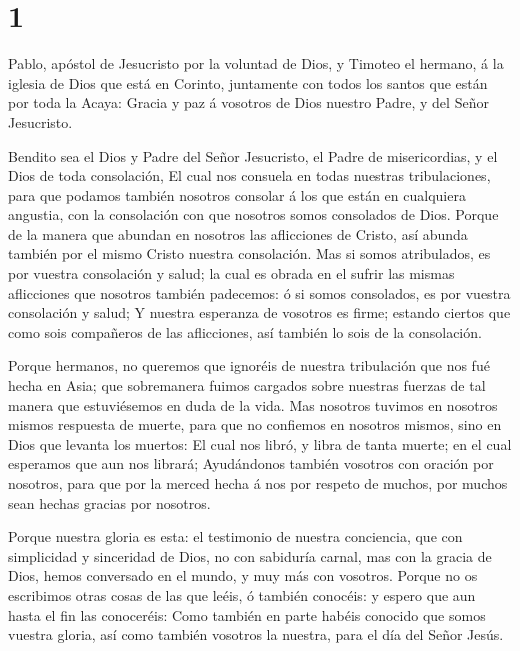 \hypertarget{section}{%
\section{1}\label{section}}

 Pablo, apóstol de Jesucristo por la voluntad de Dios, y
Timoteo el hermano, á la iglesia de Dios que está en Corinto, juntamente
con todos los santos que están por toda la Acaya:  Gracia y
paz á vosotros de Dios nuestro Padre, y del Señor Jesucristo.

 Bendito sea el Dios y Padre del Señor Jesucristo, el Padre
de misericordias, y el Dios de toda consolación,  El cual
nos consuela en todas nuestras tribulaciones, para que podamos también
nosotros consolar á los que están en cualquiera angustia, con la
consolación con que nosotros somos consolados de Dios. 
Porque de la manera que abundan en nosotros las aflicciones de Cristo,
así abunda también por el mismo Cristo nuestra consolación. 
Mas si somos atribulados, es por vuestra consolación y salud; la cual es
obrada en el sufrir las mismas aflicciones que nosotros también
padecemos: ó si somos consolados, es por vuestra consolación y salud;
 Y nuestra esperanza de vosotros es firme; estando ciertos
que como sois compañeros de las aflicciones, así también lo sois de la
consolación.

 Porque hermanos, no queremos que ignoréis de nuestra
tribulación que nos fué hecha en Asia; que sobremanera fuimos cargados
sobre nuestras fuerzas de tal manera que estuviésemos en duda de la
vida.  Mas nosotros tuvimos en nosotros mismos respuesta de
muerte, para que no confiemos en nosotros mismos, sino en Dios que
levanta los muertos:  El cual nos libró, y libra de tanta
muerte; en el cual esperamos que aun nos librará; 
Ayudándonos también vosotros con oración por nosotros, para que por la
merced hecha á nos por respeto de muchos, por muchos sean hechas gracias
por nosotros.

 Porque nuestra gloria es esta: el testimonio de nuestra
conciencia, que con simplicidad y sinceridad de Dios, no con sabiduría
carnal, mas con la gracia de Dios, hemos conversado en el mundo, y muy
más con vosotros.  Porque no os escribimos otras cosas de
las que leéis, ó también conocéis: y espero que aun hasta el fin las
conoceréis:  Como también en parte habéis conocido que
somos vuestra gloria, así como también vosotros la nuestra, para el día
del Señor Jesús.

